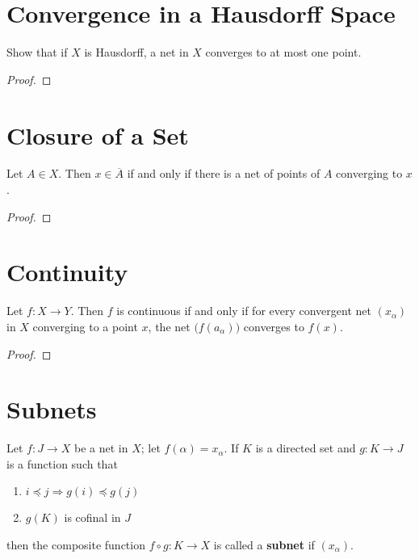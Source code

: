 \documentclass[12pt]{article}
\begin{document}
\section{Convergence in a Hausdorff Space}
Show that if $X$ is Hausdorff, a net in $X$ converges to at most one point.
\begin{proof}
\end{proof}

\section{Closure of a Set}
\begin{thm}
    Let $A \in X$. Then $x \in \overline A$ if and only if there is a net of points of $A$ converging to $x$.
\end{thm}
\begin{proof}
\end{proof}

\section{Continuity}
\begin{thm}
    Let $f: X \to Y$. Then $f$ is continuous if and only if for every convergent net $(x_\alpha)$ in $X$ converging to a point $x$, the net $\big(f(a_\alpha)\big)$ converges to $f(x)$.
\end{thm}
\begin{proof}
\end{proof}

\section{Subnets}
\begin{defn}
    Let $f: J \to X$ be a net in $X$; let $f(\alpha) = x_\alpha$. If $K$ is a directed set and $g:K \to J$ is a function such that
    \begin{enumerate}
        \item $i \preceq j \Rightarrow g(i) \preceq g(j)$
        \item $g(K)$ is cofinal in $J$
    \end{enumerate}
    then the composite function $f \circ g : K \to X$ is called a \textbf{subnet} if $(x_\alpha)$.
\end{defn}
\end{document}
